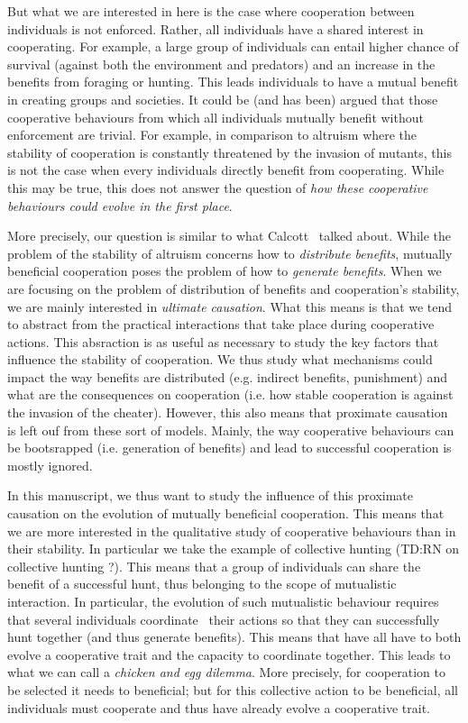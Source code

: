     But what we are interested in here is the case where cooperation between individuals is not enforced. Rather, all individuals have a shared interest in cooperating. For example, a large group of individuals can entail higher chance of survival (against both the environment and predators) and an increase in the benefits from foraging or hunting. This leads individuals to have a mutual benefit in creating groups and societies. It could be (and has been) argued that those cooperative behaviours from which all individuals mutually benefit without enforcement are trivial. For example, in comparison to altruism where the stability of cooperation is constantly threatened by the invasion of mutants, this is not the case when every individuals directly benefit from cooperating. While this may be true, this does not answer the question of \emph{how these cooperative behaviours could evolve in the first place}.

    More precisely, our question is similar to what Calcott~\parencite{Calcott2007a} talked about. While the problem of the stability of altruism concerns how to \emph{distribute benefits}, mutually beneficial cooperation poses the problem of how to \emph{generate benefits}. When we are focusing on the problem of distribution of benefits and cooperation's stability, we are mainly interested in \emph{ultimate causation}. What this means is that we tend to abstract from the practical interactions that take place during cooperative actions. This absraction is as useful as necessary to study the key factors that influence the stability of cooperation. We thus study what mechanisms could impact the way benefits are distributed (e.g. indirect benefits, punishment) and what are the consequences on cooperation (i.e. how stable cooperation is against the invasion of the cheater). However, this also means that proximate causation~\parencite{Tinbergen1963, West2007} is left ouf from these sort of models. Mainly, the way cooperative behaviours can be bootsrapped (i.e. generation of benefits) and lead to successful cooperation is mostly ignored.

    In this manuscript, we thus want to study the influence of this proximate causation on the evolution of mutually beneficial cooperation. This means that we are more interested in the qualitative study of cooperative behaviours than in their stability. In particular we take the example of collective hunting (TD:RN on collective hunting ?). This means that a group of individuals can share the benefit of a successful hunt, thus belonging to the scope of mutualistic interaction. In particular, the evolution of such mutualistic behaviour requires that several individuals coordinate~\parencite{Alvard2001, Alvard2003, Drea2009, Leimar2003} their actions so that they can successfully hunt together (and thus generate benefits). This means that have all have to both evolve a cooperative trait and the capacity to coordinate together. This leads to what we can call a \emph{chicken and egg dilemma}. More precisely, for cooperation to be selected it needs to beneficial; but for this collective action to be beneficial, all individuals must cooperate and thus have already evolve a cooperative trait.


